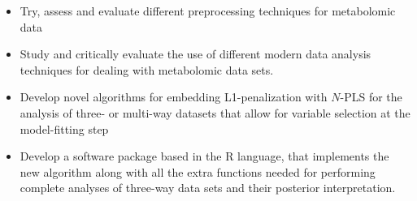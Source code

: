 \begin{itemize}
    \item Try, assess and evaluate different preprocessing techniques for metabolomic data
    \item Study and critically evaluate the use of different modern data analysis techniques for dealing with metabolomic data sets.
    \item Develop novel algorithms for embedding L1-penalization with $N$-PLS for the analysis of three- or multi-way datasets that allow for variable selection at the model-fitting step
    \item Develop a software package based in the R language, that implements the new algorithm along with all the extra functions needed for performing complete analyses of three-way data sets and their posterior interpretation.
\end{itemize}